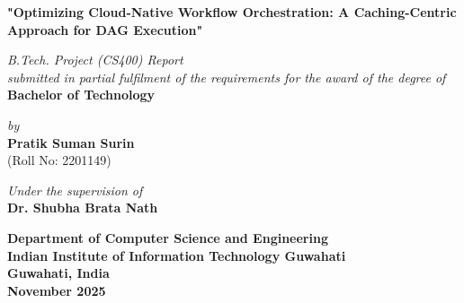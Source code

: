 \documentclass[12pt,a4paper]{report}
\begin{document}

\begin{titlepage}
    \begin{center}
        \vspace*{1cm}
        
        \textbf{\Large "Optimizing Cloud-Native Workflow Orchestration: A Caching-Centric Approach for DAG Execution"}
        
        \vspace{1.5cm}
        
        \textit{B.Tech. Project (CS400) Report}\\
        \textit{submitted in partial fulfilment of the requirements for the award of the degree of}\\
        
        \vspace{0.8cm}
        \textbf{\large Bachelor of Technology}
        
        \vspace{1.5cm}
        
        \textit{by}\\
        \vspace{0.8cm}
        \textbf{\Large Pratik Suman Surin}\\
        \vspace{0.3cm}
        (Roll No: 2201149)
        
        \vspace{2.5cm}
        
        \textit{Under the supervision of}\\
        \textbf{\Large Dr. Shubha Brata Nath}
        
        \vfill
        
        \vspace{1cm}
        
        \textbf{\large Department of Computer Science and Engineering}\\
        \textbf{\large Indian Institute of Information Technology Guwahati}\\
        \textbf{Guwahati, India}\\
        \textbf{November 2025}
        
    \end{center}
\end{titlepage}
\end{document}
